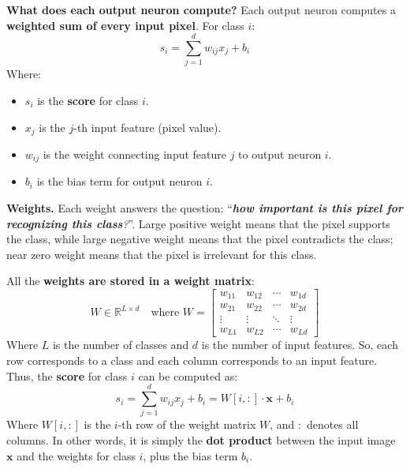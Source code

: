 \highspace
\textcolor{Green3}{ \textbf{What does each output neuron compute?}} Each output neuron computes a \textbf{weighted sum of every input pixel}. For class $i$:
\begin{equation}
    s_i = \sum_{j=1}^{d} w_{ij} x_j + b_i
\end{equation}
Where:
\begin{itemize}
    \item $s_i$ is the \textbf{score} for class $i$.
    \item $x_{j}$ is the $j$-th input feature (pixel value).
    \item $w_{ij}$ is the weight connecting input feature $j$ to output neuron $i$.
    \item $b_i$ is the bias term for output neuron $i$.
\end{itemize}
\textcolor{Green3}{ \textbf{Weights.}} Each weight answers the question: ``\emph{\textbf{how important is this pixel for recognizing this class}?}''. Large positive weight means that the pixel supports the class, while large negative weight means that the pixel contradicts the class; near zero weight means that the pixel is irrelevant for this class.

\highspace
All the \textbf{weights are stored in a weight matrix}:
\begin{equation}
    W \in \mathbb{R}^{L \times d} \quad \text{where } W = \begin{bmatrix}
        w_{11} & w_{12} & \cdots    & w_{1d} \\
        w_{21} & w_{22} & \cdots    & w_{2d} \\
        \vdots & \vdots & \ddots    & \vdots \\
        w_{L1} & w_{L2} & \cdots    & w_{Ld}
    \end{bmatrix}
\end{equation}
Where $L$ is the number of classes and $d$ is the number of input features. So, each row corresponds to a class and each column corresponds to an input feature. Thus, the \textbf{score} for class $i$ can be computed as:
\begin{equation}\label{eq:score-for-class-i}
    s_i = \sum_{j=1}^{d} w_{ij} x_j + b_i = W\left[i, :\right] \cdot \mathbf{x} + b_i
\end{equation}
Where $W\left[i, :\right]$ is the $i$-th row of the weight matrix $W$, and $:$ denotes all columns. In other words, it is simply the \textbf{dot product} between the input image $\mathbf{x}$ and the weights for class $i$, plus the bias term $b_i$.

